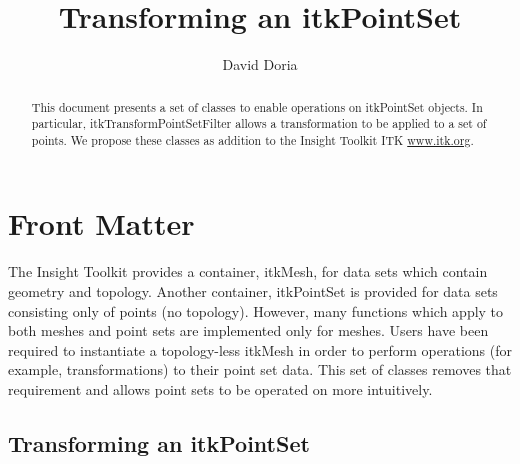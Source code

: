 \documentclass{InsightArticle}
\title{Transforming an itkPointSet}
\author{David Doria}
\newcommand{\IJhandlerIDnumber}{3112}
\begin{document}
%
% 
\IJhandlefooter{\IJhandlerIDnumber}


\ifpdf
\else
\fi


\maketitle


\ifhtml
\chapter*{Front Matter\label{front}}
\fi


\begin{abstract}
\noindent
This document presents a set of classes to enable operations on itkPointSet objects. In particular, itkTransformPointSetFilter allows a transformation to be applied to a set of points. We propose these classes as addition to the Insight Toolkit ITK \url{www.itk.org}.

\end{abstract}

\IJhandlenote{\IJhandlerIDnumber}

\tableofcontents

The Insight Toolkit provides a container, itkMesh, for data sets which contain geometry and topology. Another container, itkPointSet is provided for data sets consisting only of points (no topology). However, many functions which apply to both meshes and point sets are implemented only for meshes. Users have been required to instantiate a topology-less itkMesh in order to perform operations (for example, transformations) to their point set data. This set of classes removes that requirement and allows point sets to be operated on more intuitively.

\section{Transforming an itkPointSet}
\end{document}
